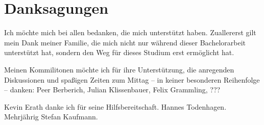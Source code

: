 
\chapter*{Danksagungen}

Ich möchte mich bei allen bedanken, die mich unterstützt haben.
Zuallererst gilt mein Dank meiner Familie, die mich nicht nur während dieser Bachelorarbeit unterstützt hat, sondern den Weg für dieses Studium erst ermöglicht hat.

Meinen Kommilitonen möchte ich für ihre Unterstützung, die anregenden Diskussionen und spaßigen Zeiten zum Mittag -- in keiner besonderen Reihenfolge -- danken:
Peer Berberich,
Julian Klissenbauer,
Felix Grammling,
???

Kevin Erath danke ich für seine  Hilfsbereitschaft. Hannes Todenhagen.
Mehrjährig Stefan Kaufmann.







